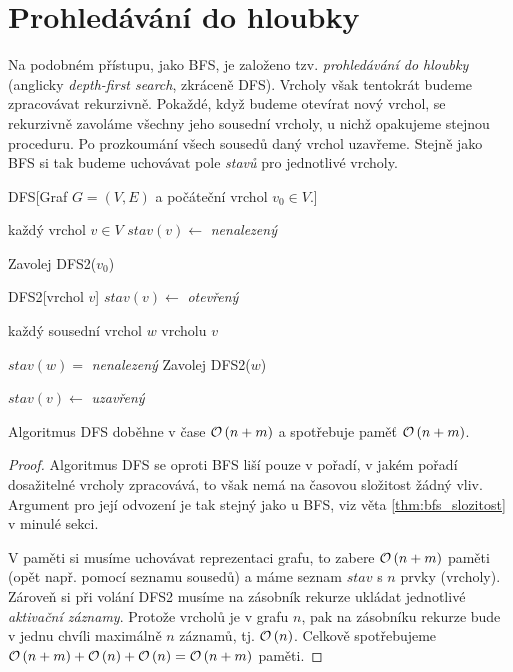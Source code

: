 \section{Prohledávání do hloubky}\label{sec:dfs}
Na podobném přístupu, jako BFS, je založeno tzv. \emph{prohledávání do hloubky} (anglicky \emph{depth-first search}, zkráceně DFS). Vrcholy však tentokrát budeme zpracovávat rekurzivně. Pokaždé, když budeme otevírat nový vrchol, se rekurzivně zavoláme všechny jeho sousední vrcholy, u nichž opakujeme stejnou proceduru. Po prozkoumání všech sousedů daný vrchol uzavřeme. Stejně jako BFS si tak budeme uchovávat pole \emph{stavů} pro jednotlivé vrcholy.
\begin{pseudo}{DFS}[Graf $G=(V,E)$ a počáteční vrchol $v_0\in V$.]
    \begin{For}{každý vrchol $v\in V$}
        $stav(v)\gets$ \textit{nenalezený}
    \end{For}
    Zavolej DFS2($v_0$)\\

    \begin{Function}{DFS2}[vrchol $v$]
        $stav(v)\gets$ \textit{otevřený}\\
        \begin{For}{každý sousední vrchol $w$ vrcholu $v$}
            \begin{If}{$stav(w)=$ \textit{nenalezený}}
                Zavolej DFS2($w$)
            \end{If}
        \end{For}
        $stav(v)\gets$ \textit{uzavřený}
    \end{Function}
\end{pseudo}
\begin{theorem}\label{thm:dfs_slozitost}
    Algoritmus DFS doběhne v čase $\mathcal{O}\left(n+m\right)$ a spotřebuje paměť $\mathcal{O}\left(n+m\right)$.
\end{theorem}
\begin{proof}
    Algoritmus DFS se oproti BFS liší pouze v pořadí, v jakém pořadí dosažitelné vrcholy zpracovává, to však nemá na časovou složitost žádný vliv. Argument pro její odvození je tak stejný jako u BFS, viz věta \ref{thm:bfs_slozitost} v minulé sekci.

    V paměti si musíme uchovávat reprezentaci grafu, to zabere $\mathcal{O}\left(n+m\right)$ paměti (opět např. pomocí seznamu sousedů) a máme seznam $stav$ s $n$ prvky (vrcholy). Zároveň si při volání \textsc{DFS2} musíme na zásobník rekurze ukládat jednotlivé \emph{aktivační záznamy}. Protože vrcholů je v grafu $n$, pak na zásobníku rekurze bude v jednu chvíli maximálně $n$ záznamů, tj. $\mathcal{O}\left(n\right)$. Celkově spotřebujeme $\mathcal{O}\left(n+m\right)+\mathcal{O}\left(n\right)+\mathcal{O}\left(n\right)=\mathcal{O}\left(n+m\right)$ paměti.
\end{proof}
